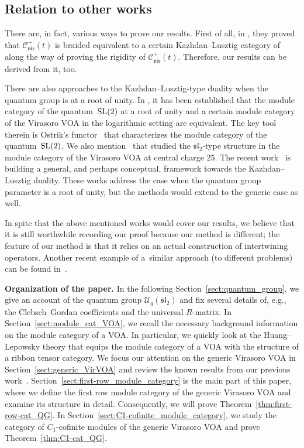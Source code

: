 \documentclass[pdftex]{sigma}
\numberwithin{equation}{section}
\newcommand{\what}[1]{\widehat{#1}}
\newcommand{\cC}{\mathcal{C}}
\newcommand{\cU}{\mathcal{U}}
\newcommand{\fsl}{\mathfrak{sl}}
\newcommand{\UEA}{\cU}
\newcommand{\Uq}{\UEA_{q}}
\newcommand{\catVir}{\cC_{\vir}}
\newcommand{\vir}{\mathfrak{vir}}
\begin{document}
\subsection{Relation to other works}
There are, in fact, various ways to prove our results.
First of all, in \cite{CJORY-tensor_categories_arising_from_Virasoro_algebra},
they proved that $\catVir^{+}(t)$ is braided equivalent to a certain Kazhdan--Lusztig category of \smash{$\what{\fsl}_{2}$} along the way of proving the rigidity of $\catVir^{+}(t)$.
Therefore, our results can be derived from it, too.


There are also approaches to the Kazhdan--Lusztig-type duality when the quantum group is at a root of unity.
In \cite{GannonNegron-quantum_sltwo_and_log_VOAs}, it has been established that the module category of the quantum~${\rm SL}(2)$ at a root of unity and a certain module category of the Virasoro VOA in the logarithmic setting are equivalent.
The key tool therein is Ostrik's functor~\cite{ostrik2005module} that characterizes the module category of the quantum~${\rm SL}(2)$.
We also mention~\cite{McRaeYang2022} that studied the $\fsl_{2}$-type structure in the module category of the Virasoro VOA at central charge $25$.
The recent work~\cite{creutzig2023algebraic,lentner2025conditional} is building a general, and perhaps conceptual, framework towards the Kazhdan--Lusztig duality.
These works address the case when the quantum group parameter is a root of unity, but the methods would extend to the generic case as well.

In spite that the above mentioned works would cover our results, we believe that it is still worthwhile recording our proof because our method is different;
the feature of our method is that it relies on an actual construction of intertwining operators.
Another recent example of a~similar approach (to different problems) can be found in~\cite{nakano2024fusion}.



{\bf Organization of the paper.}
In the following Section~\ref{sect:quantum_group}, we give an account of the quantum group $\Uq(\fsl_{2})$
and fix several details of, e.g., the Clebsch--Gordan coefficients and the universal $R$-matrix.
In Section~\ref{sect:module_cat_VOA}, we recall the necessary background information on the module category of a VOA.
In particular, we quickly look at the Huang--Lepowsky theory that equips the module category of a VOA with the structure of a ribbon tensor category.
We focus our attention on the generic Virasoro VOA in Section~\ref{sect:generic_VirVOA} and review the known results from our previous work~\cite{KoshidaKytola2022}.
Section~\ref{sect:first-row_module_category} is the main part of this paper, where we define the first row module category of the generic Virasoro VOA and examine its structure in detail. Consequently, we will prove Theorem~\ref{thm:first-row-cat_QG}.
In Section~\ref{sect:C1-cofinite_module_category}, we study the category of $C_{1}$-cofinite modules of the generic Virasoro VOA and prove Theorem~\ref{thm:C1-cat_QG}.
\end{document}
